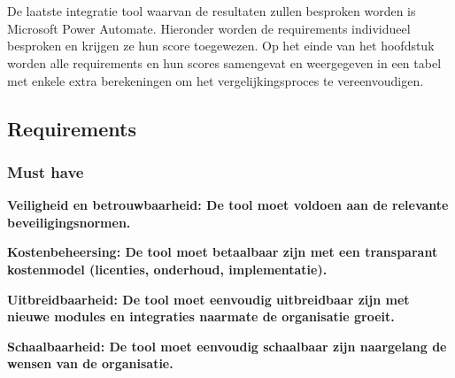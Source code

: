 \chapter{}
\label{ch:Microsoft}

De laatste integratie tool waarvan de resultaten zullen besproken worden is Microsoft Power Automate. Hieronder worden de requirements individueel besproken en krijgen ze hun score toegewezen. Op het einde van het hoofdstuk worden alle requirements en hun scores samengevat en weergegeven in een tabel met enkele extra berekeningen om het vergelijkingsproces te vereenvoudigen.

\section{Requirements}%
\label{RequirementsMicrosoft}

\subsection{Must have}%
\label{MustHaveMicrosoft}

\textbf{Veiligheid en betrouwbaarheid: De tool moet voldoen aan de relevante beveiligingsnormen.}

\vspace{\baselineskip}

\vspace{\baselineskip}

\textbf{Kostenbeheersing: De tool moet betaalbaar zijn met een transparant kostenmodel (licenties, onderhoud, implementatie).}

\vspace{\baselineskip}



\vspace{\baselineskip}

\textbf{Uitbreidbaarheid: De tool moet eenvoudig uitbreidbaar zijn met nieuwe modules en integraties naarmate de organisatie groeit.}

\vspace{\baselineskip}



\vspace{\baselineskip}

\textbf{Schaalbaarheid: De tool moet eenvoudig schaalbaar zijn naargelang de wensen van de organisatie.}

\vspace{\baselineskip}



